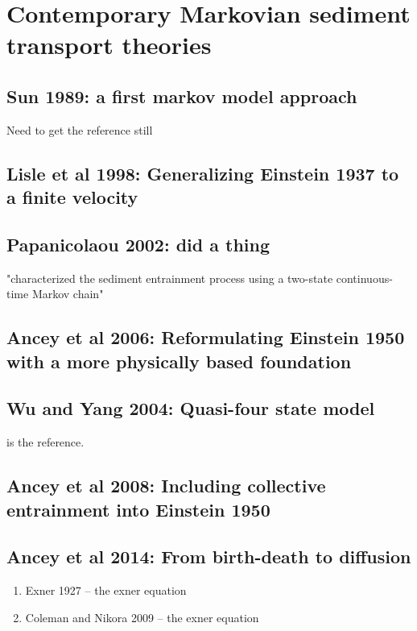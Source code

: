\section{Contemporary Markovian sediment transport theories}

\subsection*{Sun 1989: a first markov model approach} 
Need to get the reference still 

\subsection*{Lisle et al 1998: Generalizing Einstein 1937 to a finite velocity} 
\citep{Lisle1998}

\subsection*{Papanicolaou 2002: did a thing}
\citep{Papanicolaou2002}
"characterized the sediment entrainment
process using a two-state continuous-time Markov chain"

\subsection*{Ancey et al 2006: Reformulating Einstein 1950 with a more physically based foundation}
\citep{Ancey2006}

\subsection*{Wu and Yang 2004: Quasi-four state model}
\citep{Wu2004a} is the reference. 

\subsection*{Ancey et al 2008: Including collective entrainment into Einstein 1950} 
\citep{Ancey2008}

\subsection*{Ancey et al 2014: From birth-death to diffusion} 
\citep{Coleman2009, Ancey2014}
\begin{enumerate}
\item Exner 1927 -- the exner equation 
\item Coleman and Nikora 2009 -- the exner equation
\end{enumerate} 

